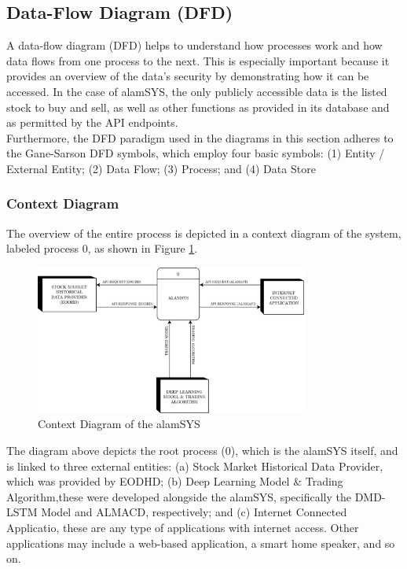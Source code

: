 \subsection{Data-Flow Diagram (DFD)}
\label{subsec:dfd}
A data-flow diagram (DFD) helps to understand how processes work and how data flows 
from one process to the next. This is especially important because it provides an 
overview of the data's security by demonstrating how it can be accessed. 
In the case of alamSYS, the only publicly accessible data is the listed stock to buy and sell, 
as well as other functions as provided in its database and as permitted by the API endpoints.
\hfill \\

Furthermore, the DFD paradigm used in the diagrams in this section adheres to 
the Gane-Sarson DFD symbols, which employ four basic symbols: 
(1) Entity / External Entity; 
(2) Data Flow; 
(3) Process; and 
(4) Data Store 
\cite{VisualParadigm}


\subsubsection{Context Diagram}
\label{subsubsec:context_dfd}
The overview of the entire process is depicted in a context diagram of the system, 
labeled process 0, as shown in Figure
\ref{fig:context_dfd}.
\begin{figure}[ht]
    \centering
    \includegraphics[width=0.80\textwidth]{./assets/Chapter_3/DFD/DFD_Context.png}
    \caption{Context Diagram of the alamSYS}
    \label{fig:context_dfd}
\end{figure}
\FloatBarrier
\vspace{0.5cm}
The diagram above depicts the root process (0), which is the alamSYS itself, 
and is linked to three external entities: 
(a) Stock Market Historical Data Provider, which was provided by EODHD;
(b) Deep Learning Model \& Trading Algorithm,these were developed alongside the 
alamSYS, specifically the DMD-LSTM Model and ALMACD, respectively; and 
(c) Internet Connected Applicatio, these are any type of applications with 
internet access. Other applications may include a web-based application, a 
smart home speaker, and so on.
\\

